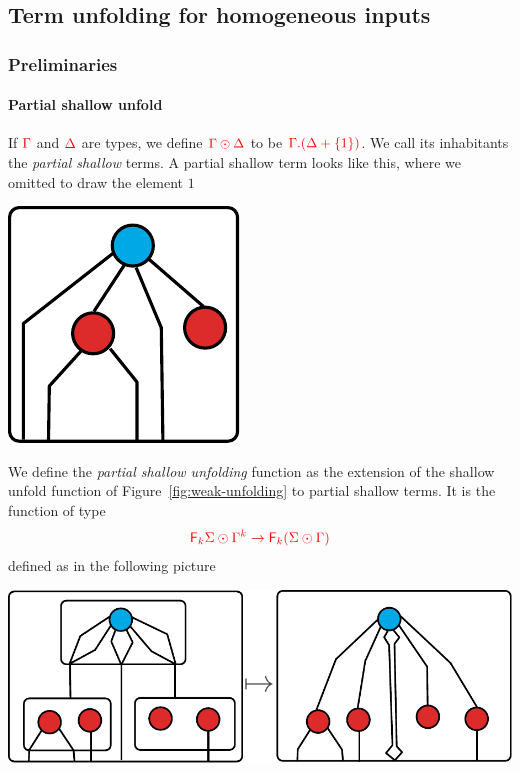 
\subsection{Term unfolding for homogeneous inputs}
\label{sec:homo-unfold}

\subsubsection{Preliminaries}

\paragraph*{Partial shallow unfold}
 If ${\color{red}{\Gamma}}$ and ${\color{red}{\Delta}}$ are types, we define ${\color{red}{\Gamma\odot\Delta}}$ to be ${\color{red}{\Gamma.(\Delta+\{1\})}}$. We call its inhabitants the \emph{partial shallow} terms. A partial shallow term looks like this, where we omitted to draw the element $1$ 
\begin{center}
\includegraphics[scale=.4]{partial-shallow-term.pdf}
\end{center}
We define the \emph{partial shallow unfolding} function as the extension  of the shallow unfold function of Figure~\ref{fig:weak-unfolding} to partial shallow terms. It is the function of type 
\begin{align*}
{\color{red}{{{\color{red}{\mathsf F_{k}}}\Sigma}\odot{\Gamma^k} \to {\color{red}{\mathsf F_{k}}}({\Sigma}\odot{\Gamma})}} 
\end{align*}
defined as in the following picture
 \begin{center}
\includegraphics[scale=.4]{partial-shallow-unfold.pdf}
 \end{center}

